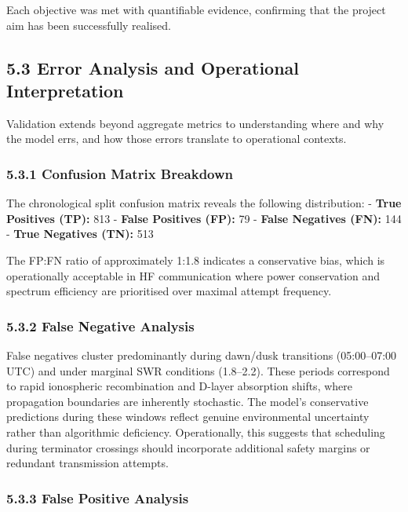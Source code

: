 Each objective was met with quantifiable evidence, confirming that the
project aim has been successfully realised.

\subsection{5.3 Error Analysis and Operational
Interpretation}\label{error-analysis-and-operational-interpretation}

Validation extends beyond aggregate metrics to understanding where and
why the model errs, and how those errors translate to operational
contexts.

\subsubsection{5.3.1 Confusion Matrix
Breakdown}\label{confusion-matrix-breakdown}

The chronological split confusion matrix reveals the following
distribution: - \textbf{True Positives (TP):} 813 - \textbf{False
Positives (FP):} 79 - \textbf{False Negatives (FN):} 144 - \textbf{True
Negatives (TN):} 513

The FP:FN ratio of approximately 1:1.8 indicates a conservative bias,
which is operationally acceptable in HF communication where power
conservation and spectrum efficiency are prioritised over maximal
attempt frequency.

\subsubsection{5.3.2 False Negative
Analysis}\label{false-negative-analysis}

False negatives cluster predominantly during dawn/dusk transitions
(05:00--07:00 UTC) and under marginal SWR conditions (1.8--2.2). These
periods correspond to rapid ionospheric recombination and D-layer
absorption shifts, where propagation boundaries are inherently
stochastic. The model's conservative predictions during these windows
reflect genuine environmental uncertainty rather than algorithmic
deficiency. Operationally, this suggests that scheduling during
terminator crossings should incorporate additional safety margins or
redundant transmission attempts.

\subsubsection{5.3.3 False Positive
Analysis}\label{false-positive-analysis}

